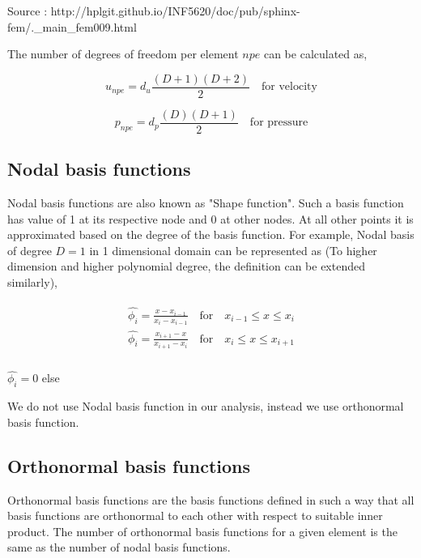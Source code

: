 \documentclass[a4paper]{book}
\begin{document}
Source : http://hplgit.github.io/INF5620/doc/pub/sphinx-fem/.\_main\_fem009.html 
\newpage

The number of degrees of freedom per element $npe$ can be calculated as,

\begin{equation} \label{unpe}
u_{npe} = d_u \frac{(D+1)(D+2)}{2} \quad \textrm{for velocity}
\end{equation} 

\begin{equation} \label{pnpe}
p_{npe} = d_p \frac{(D)(D+1)}{2} \quad \textrm{for pressure}
\end{equation} 


\subsection{Nodal basis functions}

Nodal basis functions are also known as "Shape function". Such a basis function has value of 1 at its respective node and 0 at other nodes. At all other points it is approximated based on the degree of the basis function. 
For example, Nodal basis of degree $D=1$ in 1 dimensional domain can be represented as (To higher dimension and higher polynomial degree, the definition can be extended similarly),

\begin{equation}
\begin{aligned}
\begin{split}
\hat{\phi_i} = \frac{x-x_{i-1}}{x_i-x_{i-1}} \quad \textrm{for} \quad x_{i-1} \leq x \leq x_i\\
\hat{\phi_i} = \frac{x_{i+1}-x}{x_{i+1}-x_{i}} \quad \textrm{for} \quad x_{i} \leq x \leq x_{i+1}\\
\end{split}
\end{aligned}
\end{equation}
\begin{center}
$\hat{\phi_i} = 0$ else
\end{center}

We do not use Nodal basis function in our analysis, instead we use orthonormal basis function.

\subsection{Orthonormal basis functions}

Orthonormal basis functions are the basis functions defined in such a way that all basis functions are orthonormal to each other with respect to suitable inner product. The number of orthonormal basis functions for a given element is the same as the number of nodal basis functions. 
\end{document}
